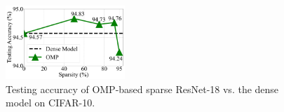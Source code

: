 \begin{figure}
\vspace*{-5mm}
\centerline{
\includegraphics[width=45mm,height=!]{figs/OMP_on_CIFAR-10_ResNet18.pdf}
}
\vspace*{-2mm}
\caption{\footnotesize{
{Testing accuracy  of   OMP-based sparse ResNet-18   vs. the   dense model on CIFAR-10. 
}
}}
  \label{fig: OMP_results}
 \vspace*{-5mm}
\end{figure}